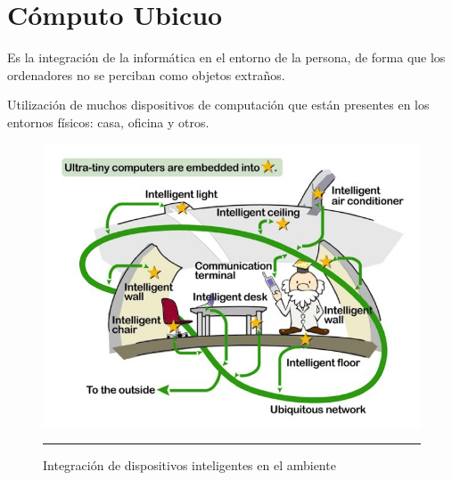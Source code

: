 \section{Cómputo Ubicuo}

Es la integración de la informática en el entorno de la persona, de forma que los ordenadores no se perciban como objetos extraños.

Utilización de muchos dispositivos de computación que están presentes en los entornos físicos: casa, oficina y otros.

\begin{figure}[htbp]
	\centering
		\includegraphics{Figuras/ubicuo.png}
		\rule{35em}{0.5pt}
	\caption[Integración de dispositivos inteligentes en el ambiente]{Integración de dispositivos inteligentes en el ambiente \cite{ubicuo}}
	\label{fig:ubicuo}
\end{figure}
